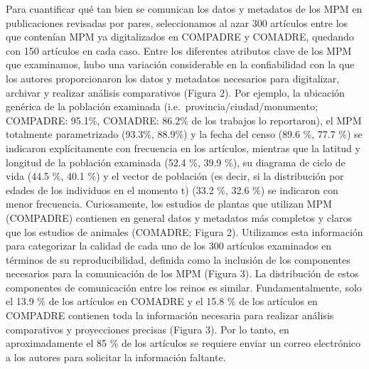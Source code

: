 \documentclass[
]{book}
\theoremstyle{definition}
\theoremstyle{definition}
\theoremstyle{definition}
\theoremstyle{definition}
\theoremstyle{remark}
\begin{document}
Para cuantificar qué tan bien se comunican los datos y metadatos de los MPM en publicaciones revisadas por pares, seleccionamos al azar 300 artículos entre los que contenían MPM ya digitalizados en COMPADRE y COMADRE, quedando con 150 artículos en cada caso. Entre los diferentes atributos clave de los MPM que examinamos, hubo una variación considerable en la confiabilidad con la que los autores proporcionaron los datos y metadatos necesarios para digitalizar, archivar y realizar análisis comparativos (Figura 2). Por ejemplo, la ubicación genérica de la población examinada (i.e.~provincia/ciudad/monumento; COMPADRE: 95.1\%, COMADRE: 86.2\% de los trabajos lo reportaron), el MPM totalmente parametrizado (93.3\%, 88.9\%) y la fecha del censo (89.6 \%, 77.7 \%) se indicaron explícitamente con frecuencia en los artículos, mientras que la latitud y longitud de la población examinada (52.4 \%, 39.9 \%), su diagrama de ciclo de vida (44.5 \%, 40.1 \%) y el vector de población (es decir, si la distribución por edades de los individuos en el momento t) (33.2 \%, 32.6 \%) se indicaron con menor frecuencia. Curiosamente, los estudios de plantas que utilizan MPM (COMPADRE) contienen en general datos y metadatos más completos y claros que los estudios de animales (COMADRE; Figura 2). Utilizamos esta información para categorizar la calidad de cada uno de los 300 artículos examinados en términos de su reproducibilidad, definida como la inclusión de los componentes necesarios para la comunicación de los MPM (Figura 3). La distribución de estos componentes de comunicación entre los reinos es similar. Fundamentalmente, solo el 13.9 \% de los artículos en COMADRE y el 15.8 \% de los artículos en COMPADRE contienen toda la información necesaria para realizar análisis comparativos y proyecciones precisas (Figura 3). Por lo tanto, en aproximadamente el 85 \% de los artículos se requiere enviar un correo electrónico a los autores para solicitar la información faltante.
\end{document}
